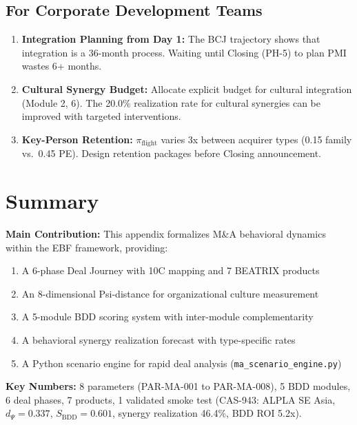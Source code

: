 \subsection{For Corporate Development Teams}

\begin{enumerate}
\item \textbf{Integration Planning from Day 1:} The BCJ trajectory shows that
      integration is a 36-month process. Waiting until Closing (PH-5) to plan
      PMI wastes 6+ months.
\item \textbf{Cultural Synergy Budget:} Allocate explicit budget for cultural
      integration (Module 2, 6). The 20.0\% realization rate for cultural
      synergies can be improved with targeted interventions.
\item \textbf{Key-Person Retention:} $\pi_{\text{flight}}$ varies 3x between
      acquirer types (0.15 family vs.\ 0.45 PE). Design retention packages
      before Closing announcement.
\end{enumerate}



\section{Summary}
\label{sec:ma-summary}

\begin{tcolorbox}[colback=gray!10!white, colframe=gray!75!black, title=Summary]

\textbf{Main Contribution:} This appendix formalizes M\&A behavioral dynamics
within the EBF framework, providing:
\begin{enumerate}[nosep]
\item A 6-phase Deal Journey with 10C mapping and 7 BEATRIX products
\item An 8-dimensional Psi-distance for organizational culture measurement
\item A 5-module BDD scoring system with inter-module complementarity
\item A behavioral synergy realization forecast with type-specific rates
\item A Python scenario engine for rapid deal analysis (\texttt{ma\_scenario\_engine.py})
\end{enumerate}

\textbf{Key Numbers:} 8 parameters (PAR-MA-001 to PAR-MA-008), 5 BDD modules,
6 deal phases, 7 products, 1 validated smoke test (CAS-943: ALPLA SE Asia,
$d_\Psi = 0.337$, $S_{\text{BDD}} = 0.601$, synergy realization 46.4\%, BDD ROI 5.2x).
\end{tcolorbox}


